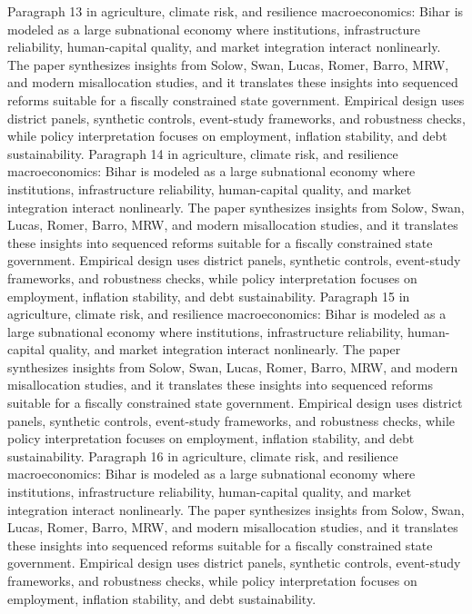 \documentclass[preprint,12pt]{elsarticle}
\begin{document}
Paragraph 13 in agriculture, climate risk, and resilience macroeconomics: Bihar is modeled as a large subnational economy where institutions, infrastructure reliability, human-capital quality, and market integration interact nonlinearly. The paper synthesizes insights from Solow, Swan, Lucas, Romer, Barro, MRW, and modern misallocation studies, and it translates these insights into sequenced reforms suitable for a fiscally constrained state government. Empirical design uses district panels, synthetic controls, event-study frameworks, and robustness checks, while policy interpretation focuses on employment, inflation stability, and debt sustainability.
Paragraph 14 in agriculture, climate risk, and resilience macroeconomics: Bihar is modeled as a large subnational economy where institutions, infrastructure reliability, human-capital quality, and market integration interact nonlinearly. The paper synthesizes insights from Solow, Swan, Lucas, Romer, Barro, MRW, and modern misallocation studies, and it translates these insights into sequenced reforms suitable for a fiscally constrained state government. Empirical design uses district panels, synthetic controls, event-study frameworks, and robustness checks, while policy interpretation focuses on employment, inflation stability, and debt sustainability.
Paragraph 15 in agriculture, climate risk, and resilience macroeconomics: Bihar is modeled as a large subnational economy where institutions, infrastructure reliability, human-capital quality, and market integration interact nonlinearly. The paper synthesizes insights from Solow, Swan, Lucas, Romer, Barro, MRW, and modern misallocation studies, and it translates these insights into sequenced reforms suitable for a fiscally constrained state government. Empirical design uses district panels, synthetic controls, event-study frameworks, and robustness checks, while policy interpretation focuses on employment, inflation stability, and debt sustainability.
Paragraph 16 in agriculture, climate risk, and resilience macroeconomics: Bihar is modeled as a large subnational economy where institutions, infrastructure reliability, human-capital quality, and market integration interact nonlinearly. The paper synthesizes insights from Solow, Swan, Lucas, Romer, Barro, MRW, and modern misallocation studies, and it translates these insights into sequenced reforms suitable for a fiscally constrained state government. Empirical design uses district panels, synthetic controls, event-study frameworks, and robustness checks, while policy interpretation focuses on employment, inflation stability, and debt sustainability.
\end{document}
